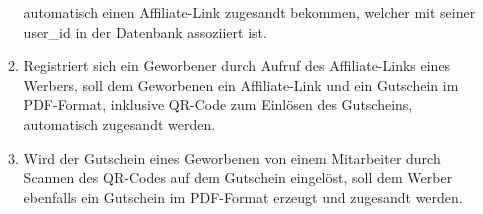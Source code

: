 \begin{enumerate}[itemsep=0em,partopsep=0em,parsep=0em,topsep=0em]
\begin{enumerate}
            automatisch einen Affiliate-Link zugesandt bekommen, welcher mit seiner
            user\_id in der Datenbank assoziiert ist.
            \item Registriert sich ein Geworbener durch Aufruf des Affiliate-Links eines Werbers, soll dem Geworbenen ein Affiliate-Link und ein Gutschein
            im \ac{PDF}-Format, inklusive \ac{QR}-Code zum Einlösen des Gutscheins, 
            automatisch zugesandt werden. 
            \item Wird der Gutschein eines Geworbenen von einem Mitarbeiter durch Scannen des \ac{QR}-Codes auf dem Gutschein eingelöst, soll dem Werber ebenfalls ein Gutschein im \ac{PDF}-Format erzeugt und zugesandt werden.
        \end{enumerate}
\end{enumerate}